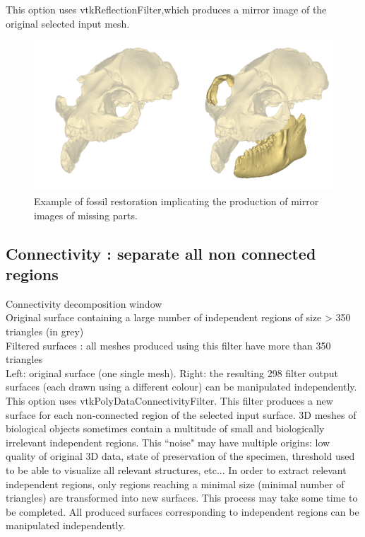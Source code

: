 This option uses vtkReflectionFilter,which produces a mirror image of the original selected input mesh.\\

\begin{figure}
  \centering
  \includegraphics[scale=0.35]{images/Edit_selected_objects/02_Mirror.png} 
	\caption{Example of fossil restoration implicating the production of mirror images of missing parts.}
 
\end{figure}

\subsection{Connectivity : separate all non connected regions}

Connectivity decomposition window\\

Original surface containing a large number of independent regions of size > 350 triangles (in grey)\\

Filtered surfaces : all meshes produced using this filter have more than 350 triangles\\

Left: original surface (one single mesh). Right: the resulting 298 filter output surfaces (each drawn using a different colour) can be manipulated independently.\\


This option uses vtkPolyDataConnectivityFilter. This filter produces a new surface for each non-connected region of the selected input surface. 3D meshes of biological objects sometimes contain a multitude of small and biologically irrelevant independent regions. This ``noise" may have multiple origins: low quality of original 3D data, state of preservation of the specimen, threshold used to be able to visualize all relevant structures, etc... In order to extract relevant independent regions, only regions reaching a minimal size (minimal number of triangles) are transformed into new surfaces. This process may take some time to be completed. All produced surfaces corresponding to independent regions can be manipulated independently.



